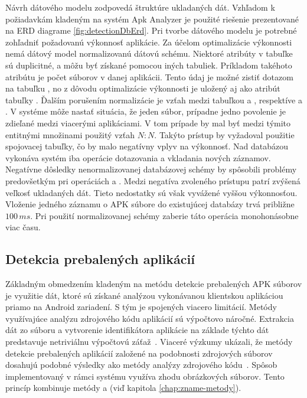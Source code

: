 \noindent Návrh dátového modelu zodpovedá štruktúre ukladaných dát. Vzhľadom k požiadavkám kladeným na systém Apk Analyzer je použité riešenie prezentované na ERD diagrame \ref{fig:detectionDbErd}. Pri tvorbe dátového modelu je potrebné zohľadniť požadovanú výkonnosť aplikácie. Za účelom optimalizácie výkonnosti nemá dátový model normalizovanú dátovú schému. Niektoré atribúty v tabuľke  sú duplicitné, a môžu byť získané pomocou iných tabuliek. Príkladom takéhoto atribútu je počet  súborov v danej aplikácii. Tento údaj je možné zistiť dotazom na tabuľku , no z dôvodu optimalizácie výkonnosti je uložený aj ako atribút tabuľky .
Ďalším porušením normalizácie je vzťah medzi tabuľkou  a , respektíve  a . V systéme môže nastať situácia, že jeden súbor, prípadne jedno povolenie je zdieľané medzi viacerými aplikáciami. V tom prípade by mal byť medzi týmito entitnými množinami použitý vzťah $N : N$. Takýto prístup by vyžadoval použitie spojovacej tabuľky, čo by malo negatívny vplyv na výkonnosť. Nad databázou vykonáva systém  iba operácie dotazovania a vkladania nových záznamov. Negatívne dôsledky nenormalizovanej databázovej schémy by spôsobili problémy predovšetkým pri operáciách  a . Medzi negatíva zvoleného prístupu patrí zvýšená veľkosť ukladaných dát. Tieto nedostatky sú však vyvážené vyššou výkonnosťou. Vloženie jedného záznamu o APK súbore do existujúcej databázy trvá približne $100\, ms$. Pri použití normalizovanej schémy zaberie táto operácia monohonásobne viac času.  

\subsection{Detekcia prebalených aplikácií}

Základným obmedzením kladeným na metódu detekcie prebalených APK súborov je využitie dát, ktoré sú získané analýzou vykonávanou klientskou aplikáciou priamo na Android zariadení. S tým je spojených viacero limitácií. 
Metódy využívajúce analýzu zdrojového kódu aplikácií sú výpočtovo náročné. Extrakcia dát zo súboru  a vytvorenie identifikátora aplikácie na základe týchto dát predstavuje netriviálnu výpočtovú záťaž~\cite{Zhou2012}. Viaceré výzkumy ukázali, že metódy detekcie prebalených aplikácií založené na podobnosti zdrojových súborov dosahujú podobné výsledky ako metódy analýzy zdrojového kódu~\cite{Gadyatskaya2016,Zhauniarovich2014, ImageStruct}. Spôsob implementovaný v rámci systému  využíva zhodu obrázkových súborov. Tento princíp kombinuje metódy  a  (viď kapitola \ref{chap:zname-metody}). 

